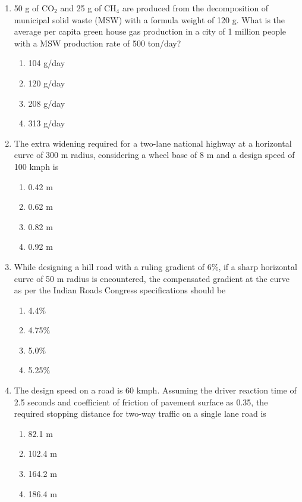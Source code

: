 \documentclass[journal,12pt,onecolumn]{IEEEtran}
\theoremstyle{remark}
\begin{document}
\begin{enumerate}
\item 50 g of $\mathrm{CO}_2$ and 25 g of $\mathrm{CH}_4$ are produced from the decomposition of municipal solid waste (MSW) with a formula weight of 120 g. What is the average per capita green house gas production in a city of 1 million people with a MSW production rate of 500 ton/day?

\hfill{}
\begin{enumerate}
\item 104 g/day
\item 120 g/day
\item 208 g/day
\item 313 g/day
\end{enumerate}

\item The extra widening required for a two-lane national highway at a horizontal curve of 300 m radius, considering a wheel base of 8 m and a design speed of 100 kmph is

\hfill{}
\begin{enumerate}
\item 0.42 m
\item 0.62 m
\item 0.82 m
\item 0.92 m
\end{enumerate}

\item While designing a hill road with a ruling gradient of 6\%, if a sharp horizontal curve of 50 m radius is encountered, the compensated gradient at the curve as per the Indian Roads Congress specifications should be

\hfill{}
\begin{enumerate}
\item 4.4\%
\item 4.75\%
\item 5.0\%
\item 5.25\%
\end{enumerate}

\item The design speed on a road is 60 kmph. Assuming the driver reaction time of 2.5 seconds and coefficient of friction of pavement surface as 0.35, the required stopping distance for two-way traffic on a single lane road is

\hfill{}
\begin{enumerate}
\item 82.1 m
\item 102.4 m
\item 164.2 m
\item 186.4 m
\end{enumerate}


\end{enumerate}
\end{document}

